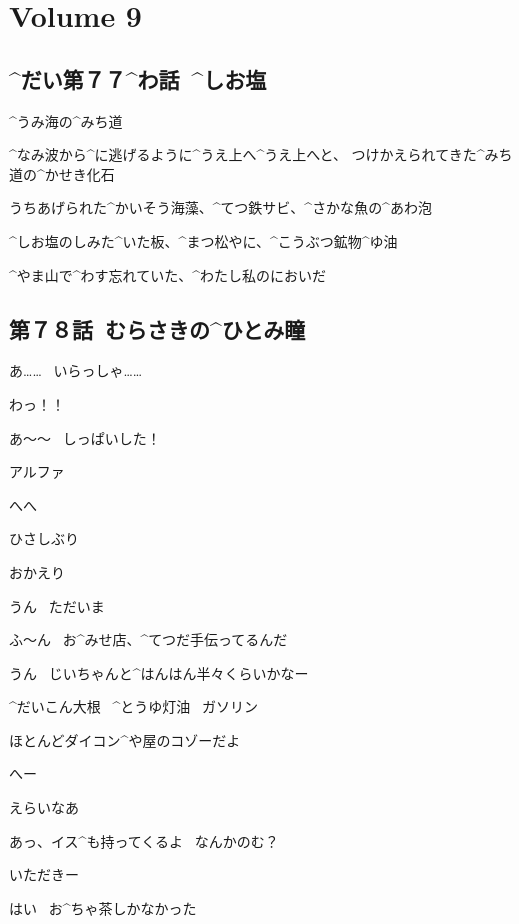 \section{Volume 9}

\subsection{^{だい}{第}７７^{わ}{話}\ ^{しお}{塩}}

\page[5]
\Alpha ^{うみ}{海}の^{みち}{道}

\Alpha ^{なみ}{波}から^{に}{逃}げるように^{うえ}{上}へ^{うえ}{上}へと、
つけかえられてきた^{みち}{道}の^{かせき}{化石}

\page[8]
\Alpha うちあげられた^{かいそう}{海藻}、^{てつ}{鉄}サビ、^{さかな}{魚}の^{あわ}{泡}

\Alpha ^{しお}{塩}のしみた^{いた}{板}、^{まつ}{松}やに、^{こうぶつ}{鉱物}^{ゆ}{油}

\page[9]
\Alpha ^{やま}{山}で^{わす}{忘}れていた、^{わたし}{私}のにおいだ


\subsection{第７８話\ むらさきの^{ひとみ}{瞳}}

\page[15]
\Takahiro あ……
\ いらっしゃ……

\page[16]
\Alpha わっ！！

\Alpha あ〜〜
\ しっぱいした！

\Takahiro アルファ

\Alpha へへ

\Alpha ひさしぶり

\page[17]
\Takahiro おかえり

\Alpha うん
\ ただいま

\Alpha ふ〜ん
\ お^{みせ}{店}、^{てつだ}{手伝}ってるんだ

\Takahiro うん
\ じいちゃんと^{はんはん}{半々}くらいかなー

\Sign ^{だいこん}{大根}
\ ^{とうゆ}{灯油}
\ ガソリン

\Takahiro ほとんどダイコン^{や}{屋}のコゾーだよ

\Alpha へー

\page[18]
\Alpha えらいなあ

\Takahiro あっ、イス^{も}{持}ってくるよ
\ なんかのむ？

\Alpha いただきー

\page[19]
\Takahiro はい
\ お^{ちゃ}{茶}しかなかった

